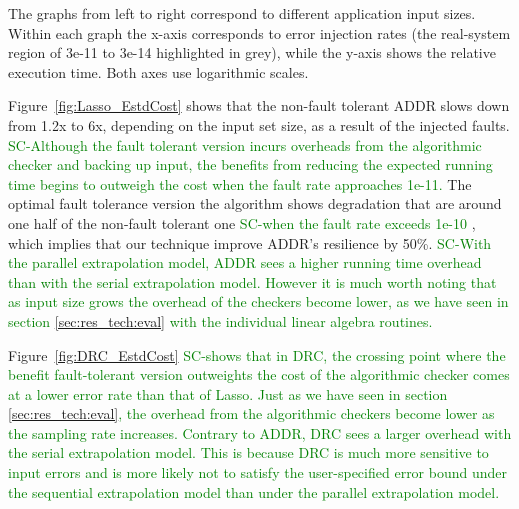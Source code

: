 \documentclass{sig-alternate}
\newcommand{\sui}[1]{%
  \textcolor{green}{SC-#1}
}
\begin{document}
The graphs from left to right correspond to different application input sizes. Within each graph the x-axis corresponds to error injection rates (the real-system region of 3e-11 to 3e-14 highlighted in grey), while the y-axis shows the relative execution time. Both axes use logarithmic scales.


Figure~\ref{fig:Lasso_EstdCost} shows that the non-fault tolerant ADDR slows down from 1.2x to 6x, depending on the input set size, as a result of the injected faults.
\sui{Although the fault tolerant version incurs overheads from the algorithmic checker and backing up input, the benefits from reducing the expected running time begins to outweigh the cost when the fault rate approaches 1e-11.} The optimal fault tolerance version the algorithm shows degradation that are around one half of the non-fault tolerant one \sui{when the fault rate exceeds 1e-10}, which implies that our technique improve ADDR's resilience by 50\%.
\sui{With the parallel extrapolation model, ADDR sees a higher running time overhead than with the serial extrapolation model. However it is much worth noting that as input size grows the overhead of the checkers become lower, as we have seen in section \ref{sec:res_tech:eval} with the individual linear algebra routines.}

Figure~\ref{fig:DRC_EstdCost} 
\sui{shows that in DRC, the crossing point where the benefit fault-tolerant version outweights the cost of the algorithmic checker comes at a lower error rate than
that of Lasso. Just as we have seen in section \ref{sec:res_tech:eval}, the overhead from the algorithmic checkers become lower as the sampling rate increases.
Contrary to ADDR, DRC sees a larger overhead with the serial extrapolation model. This is because DRC is much more sensitive to input errors and is more likely
not to satisfy the user-specified error bound under the sequential extrapolation model than under the parallel extrapolation model.
}
\end{document}

